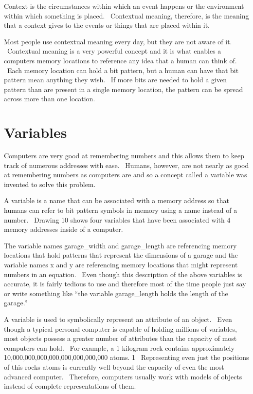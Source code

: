 \documentclass[12pt,twoside]{book}
\begin{document}
\bigskip

Context is the circumstances within which an event happens or the
environment within which something is placed. \ Contextual meaning,
therefore, is the meaning that a context gives to the events or things
that are placed within it. \ 


\bigskip

Most people use contextual meaning every day, but they are not aware of
it. \ Contextual meaning is a very powerful concept and it is what
enables a computer{\textquotesingle}s memory locations to reference any
idea that a human can think of. \ Each memory location can hold a bit
pattern, but a human can have that bit pattern mean anything they wish.
\ If more bits are needed to hold a given pattern than are present in a
single memory location, the pattern can be spread across more than one
location.

\section[Variables]{Variables}
Computers are very good at remembering numbers and this allows them to
keep track of numerous addresses with ease. \ Humans, however, are not
nearly as good at remembering numbers as computers are and so a concept
called a variable was invented to solve this problem.


\bigskip

A variable is a name that can be associated with a memory address so
that humans can refer to bit pattern symbols in memory using a name
instead of a number. \ Drawing 10 shows four variables that have been
associated with 4 memory addresses inside of a computer.


\bigskip

The variable names garage\_width and garage\_length are referencing
memory locations that hold patterns that represent the dimensions of a
garage and the variable names x and y are referencing memory locations
that might represent numbers in an equation. \ Even though this
description of the above variables is accurate, it is fairly tedious to
use and therefore most of the time people just say or write something
like ``the variable garage\_length holds the length of the garage.''


\bigskip

A variable is used to symbolically represent an attribute of an object.
\ Even though a typical personal computer is capable of holding
millions of variables, most objects possess a greater number of
attributes than the capacity of most computers can hold. \ For example,
a 1 kilogram rock contains approximately
10,000,000,000,000,000,000,000,000 atoms. 1 \ Representing even just
the positions of this rock{\textquotesingle}s atoms is currently well
beyond the capacity of even the most advanced computer. \ Therefore,
computers usually work with models of objects instead of complete
representations of them.
\end{document}
